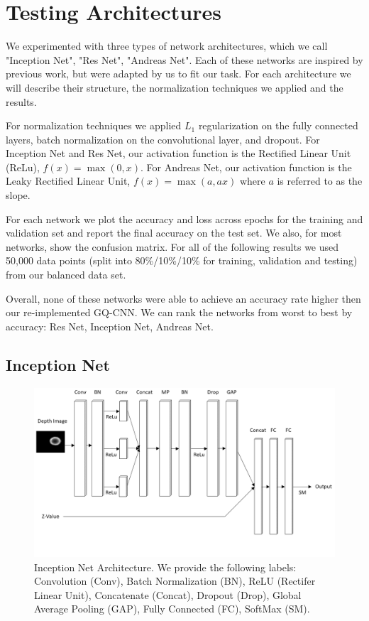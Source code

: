 
\section{Testing Architectures}
\label{sec:archs}

We experimented with three types of network architectures, which we call "Inception Net", "Res Net", "Andreas Net". 
Each of these networks are inspired by previous work, but were adapted by us to fit our task. 
For each architecture we will describe their structure, the normalization techniques we applied and the results. 
 
For normalization techniques we applied $L_{1}$ regularization on the fully connected layers, batch normalization on the convolutional layer, and dropout. 
For Inception Net and Res Net, our activation function is the Rectified Linear Unit (ReLu), $f(x) = \max(0, x)$. 
For Andreas Net, our activation function is the Leaky Rectified Linear Unit, $f(x) = \max(a, ax)$ where $a$ is referred to as the slope. 

For each network we plot the accuracy and loss across epochs for the training and validation set and report the final accuracy on the test set. 
We also, for most networks, show the confusion matrix.
For all of the following results we used 50,000 data points (split into 80\%/10\%/10\% for training, validation and testing) from our balanced data set. 

Overall, none of these networks were able to achieve an accuracy rate higher then our re-implemented GQ-CNN. 
We can rank the networks from worst to best by accuracy: Res Net, Inception Net, Andreas Net. 

\subsection{Inception Net}

\begin{figure}[t!]
    \includegraphics[width=0.99\columnwidth]{figs/inception_net.png}
\caption{Inception Net Architecture. We provide the following labels: Convolution (Conv), Batch Normalization (BN), ReLU (Rectifer Linear Unit), Concatenate (Concat), Dropout (Drop), Global Average Pooling (GAP), Fully Connected (FC), SoftMax (SM).} \label{fig:inception_net}
\end{figure}

